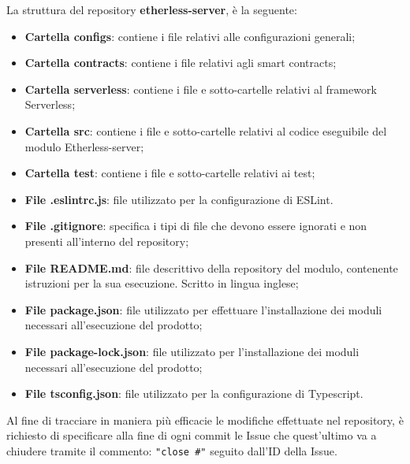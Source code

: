 			La struttura del repository \textbf{etherless-server}, è la seguente:
			\begin{itemize}
				\item \textbf{Cartella configs}: contiene i file relativi alle configurazioni generali;
				\item \textbf{Cartella contracts}: contiene i file relativi agli smart contracts;
				\item \textbf{Cartella serverless}: contiene i file e sotto-cartelle relativi al framework Serverless;
				\item \textbf{Cartella src}: contiene i file e sotto-cartelle relativi al codice eseguibile del modulo Etherless-server;
				\item \textbf{Cartella test}: contiene i file e sotto-cartelle relativi ai test;
				\item \textbf{File .eslintrc.js}: file utilizzato per la configurazione di ESLint.
				\item \textbf{File .gitignore}: specifica i tipi di file che devono essere ignorati e non presenti all'interno del repository;
				\item \textbf{File README.md}: file descrittivo della repository del modulo, contenente istruzioni per la sua esecuzione. Scritto in lingua inglese;
				\item \textbf{File package.json}: file utilizzato per effettuare l'installazione dei moduli necessari all'esecuzione del prodotto;
				\item \textbf{File package-lock.json}: file utilizzato per l'installazione dei moduli necessari all'esecuzione del prodotto;
				\item \textbf{File tsconfig.json}: file utilizzato per la configurazione di Typescript.
			\end{itemize}
			Al fine di tracciare in maniera più efficacie le modifiche effettuate nel repository, è richiesto di specificare alla fine di ogni commit le Issue che quest'ultimo va a chiudere tramite il commento: \texttt{"close \#"} seguito dall'ID della Issue.
			
